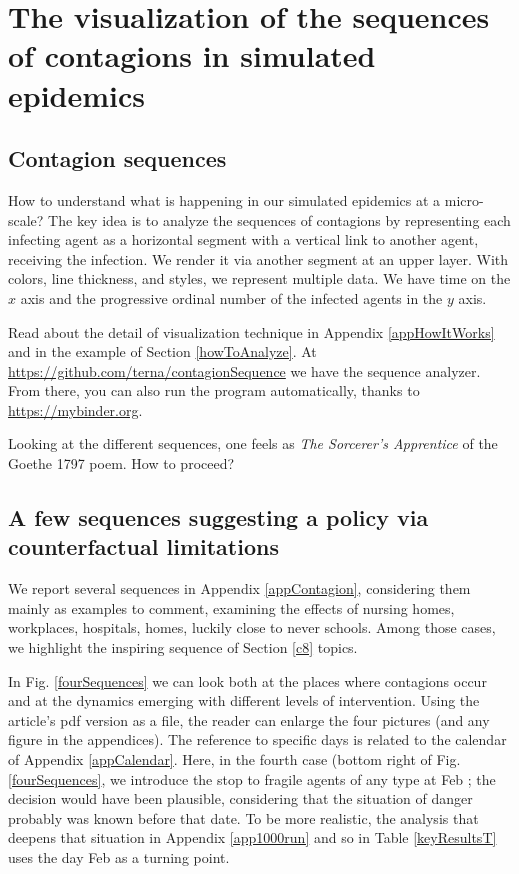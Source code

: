 \documentclass[graybox]{svmult}
\begin{document}
\section{The visualization of the sequences of contagions in simulated epidemics}
\label{visualization}

\subsection{Contagion sequences}
\label{sequences}

How to understand what is happening in our simulated epidemics at a micro-scale? The key idea is to analyze the sequences of contagions by representing each infecting agent as a horizontal segment with a vertical link to another agent, receiving the infection. We render it via another segment at an upper layer. With colors, line thickness, and styles, we represent multiple data. We have time on the $x$ axis and the progressive ordinal number of the infected agents in the $y$ axis.

Read about the detail of visualization technique in Appendix \ref{appHowItWorks} and in the example of Section \ref{howToAnalyze}. At \url{https://github.com/terna/contagionSequence} we have the sequence analyzer. From there, you can also run the program automatically, thanks to \url{https://mybinder.org}.

Looking at the different sequences, one feels as \emph{The Sorcerer's Apprentice} of the Goethe 1797 poem. How to proceed?


\subsection{A few sequences suggesting a policy via counterfactual limitations}
\label{seqSuggPol}

We report several sequences in Appendix \ref{appContagion}, considering them mainly as examples to comment, examining the effects of nursing homes, workplaces, hospitals, homes, luckily close to never schools. Among those cases, we highlight the inspiring sequence of Section \ref{c8} topics.

In Fig. \ref{fourSequences} we can look both at the places where contagions occur and at the dynamics emerging with different levels of intervention. Using the article's pdf version as a file, the reader can enlarge the four pictures (and any figure in the appendices). The reference to specific days is related to the calendar of Appendix \ref{appCalendar}. Here, in the fourth case (bottom right of Fig. \ref{fourSequences}, we introduce the stop to fragile agents of any type at Feb ; the decision would have been plausible, considering that the situation of danger probably was known before that date. To be more realistic, the analysis that deepens that situation in Appendix \ref{app1000run} and so in Table \ref{keyResultsT} uses the day Feb  as a turning point.
\end{document}
